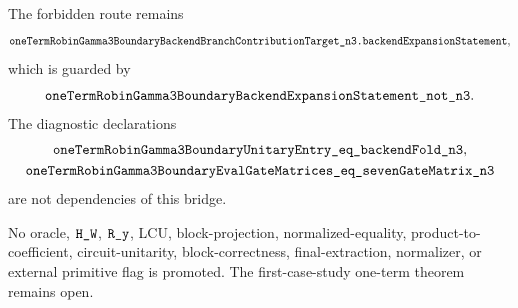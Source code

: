 The forbidden route remains
\[
  \texttt{oneTermRobinGamma3BoundaryBackendBranchContributionTarget\_n3.backendExpansionStatement},
\]
which is guarded by
\[
  \texttt{oneTermRobinGamma3BoundaryBackendExpansionStatement\_not\_n3}.
\]
The diagnostic  declarations
\[
\begin{gathered}
  \texttt{oneTermRobinGamma3BoundaryUnitaryEntry\_eq\_backendFold\_n3},\\
  \texttt{oneTermRobinGamma3BoundaryEvalGateMatrices\_eq\_sevenGateMatrix\_n3}
\end{gathered}
\]
are not dependencies of this bridge.

No oracle, \(\texttt{H\_W}\), \(\texttt{R\_y}\), LCU, block-projection,
normalized-equality, product-to-coefficient, circuit-unitarity,
block-correctness, final-extraction, normalizer, or external primitive flag is
promoted.  The first-case-study one-term theorem remains open.
